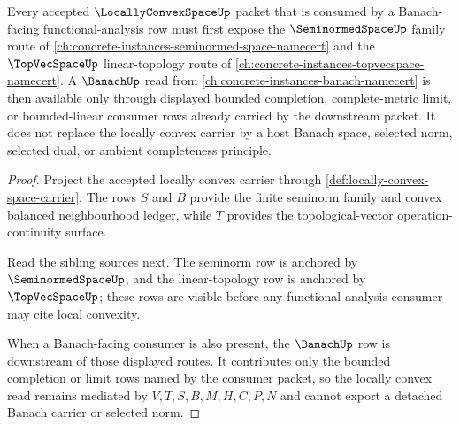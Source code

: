 \begin{theorem}
\label{thm:locally-convex-space-banach-seminorm-route}
Every accepted $\LocallyConvexSpaceUp$ packet that is consumed by a Banach-facing functional-analysis row must first expose the $\SeminormedSpaceUp$ family route of \autoref{ch:concrete-instances-seminormed-space-namecert} and the $\TopVecSpaceUp$ linear-topology route of \autoref{ch:concrete-instances-topvecspace-namecert}. A $\BanachUp$ read from \autoref{ch:concrete-instances-banach-namecert} is then available only through displayed bounded completion, complete-metric limit, or bounded-linear consumer rows already carried by the downstream packet. It does not replace the locally convex carrier by a host Banach space, selected norm, selected dual, or ambient completeness principle.
\end{theorem}
\begin{proof}
Project the accepted locally convex carrier through \autoref{def:locally-convex-space-carrier}. The rows $S$ and $B$ provide the finite seminorm family and convex balanced neighbourhood ledger, while $T$ provides the topological-vector operation-continuity surface.

Read the sibling sources next. The seminorm row is anchored by $\SeminormedSpaceUp$, and the linear-topology row is anchored by $\TopVecSpaceUp$; these rows are visible before any functional-analysis consumer may cite local convexity.

When a Banach-facing consumer is also present, the $\BanachUp$ row is downstream of those displayed routes. It contributes only the bounded completion or limit rows named by the consumer packet, so the locally convex read remains mediated by $V,T,S,B,M,H,C,P,N$ and cannot export a detached Banach carrier or selected norm.
\end{proof}

